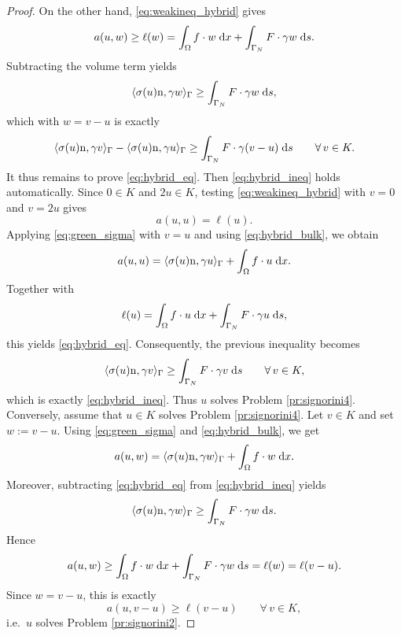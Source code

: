 \begin{proof}
	On the other hand, \eqref{eq:weakineq_hybrid} gives
	\begin{equation*}
		a(u,w)\ge \ell(w)=\int_\Omega f\cdot w\;{{\mathrm{d}} x}+\int_{\Gamma_N}F\cdot\gamma w\;{{\mathrm{d}} s}.
	\end{equation*}
	Subtracting the volume term yields
	\begin{equation*}
		\langle \sigma(u)\mathrm n,\gamma w\rangle_\Gamma
		\ge
		\int_{\Gamma_N}F\cdot\gamma w\;{{\mathrm{d}} s},
	\end{equation*}
	which with $w= v-u$ is exactly
	\begin{equation*}
		\langle \sigma(u)\mathrm n,\gamma v\rangle_\Gamma
		-
		\langle \sigma(u)\mathrm n,\gamma u\rangle_\Gamma
		\ge
		\int_{\Gamma_N}F\cdot\gamma(v-u)\;{{\mathrm{d}} s}
		\qquad \forall\, v\in K.
	\end{equation*}
	It thus remains to prove \eqref{eq:hybrid_eq}. Then \eqref{eq:hybrid_ineq} holds automatically. Since $0\in K$ and $2u\in K$, testing \eqref{eq:weakineq_hybrid} with $v=0$ and $v=2u$ gives
	\begin{equation*}
		a(u,u)=\ell(u).
	\end{equation*}
	Applying \eqref{eq:green_sigma} with $v=u$ and using \eqref{eq:hybrid_bulk}, we obtain
	\begin{equation*}
		a(u,u)
		=
		\langle \sigma(u)\mathrm n,\gamma u\rangle_\Gamma
		+\int_\Omega f\cdot u\;{{\mathrm{d}} x}.
	\end{equation*}
	Together with
	\begin{equation*}
		\ell(u)=\int_\Omega f\cdot u\;{{\mathrm{d}} x}+\int_{\Gamma_N}F\cdot\gamma u\;{{\mathrm{d}} s},
	\end{equation*}
	this yields \eqref{eq:hybrid_eq}. Consequently, the previous inequality becomes
	\begin{equation*}
		\langle \sigma(u)\mathrm n,\gamma v\rangle_\Gamma
		\ge
		\int_{\Gamma_N}F\cdot\gamma v\;{{\mathrm{d}} s}
		\qquad \forall\, v\in K,
	\end{equation*}
	which is exactly \eqref{eq:hybrid_ineq}. Thus $u$ solves Problem \ref{pr:signorini4}. Conversely, assume that $u\in K$ solves Problem \ref{pr:signorini4}. Let $v\in K$ and set $w:=v-u$. Using \eqref{eq:green_sigma} and \eqref{eq:hybrid_bulk}, we get
	\begin{equation*}
		a(u,w)
		=
		\langle \sigma(u)\mathrm n,\gamma w\rangle_\Gamma
		+\int_\Omega f\cdot w\;{{\mathrm{d}} x}.
	\end{equation*}
	Moreover, subtracting \eqref{eq:hybrid_eq} from \eqref{eq:hybrid_ineq} yields
	\begin{equation*}
		\langle \sigma(u)\mathrm n,\gamma w\rangle_\Gamma
		\ge
		\int_{\Gamma_N}F\cdot\gamma w\;{{\mathrm{d}} s}.
	\end{equation*}
	Hence
	\begin{equation*}
		a(u,w)
		\ge
		\int_\Omega f\cdot w\;{{\mathrm{d}} x}+\int_{\Gamma_N}F\cdot\gamma w\;{{\mathrm{d}} s}
		=
		\ell(w)
		=
		\ell(v-u).
	\end{equation*}
	Since $w=v-u$, this is exactly
	\begin{equation*}
		a(u,v-u)\ge \ell(v-u)\qquad \forall\, v\in K,
	\end{equation*}
	i.e.\ $u$ solves Problem \ref{pr:signorini2}.
\end{proof}


